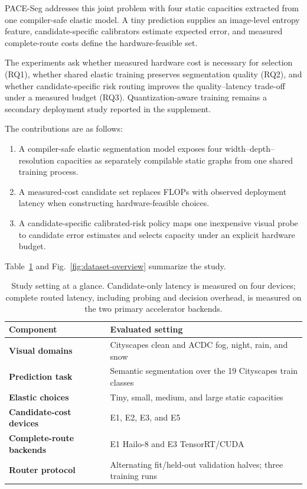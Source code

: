 \documentclass[a4paper,review,12pt]{elsarticle}
\newcommand{\method}{PACE-Seg}
\begin{document}
\method{} addresses this joint problem with four static capacities extracted from one compiler-safe elastic model. A tiny prediction supplies an image-level entropy feature, candidate-specific calibrators estimate expected error, and measured complete-route costs define the hardware-feasible set.

The experiments ask whether measured hardware cost is necessary for selection (RQ1), whether shared elastic training preserves segmentation quality (RQ2), and whether candidate-specific risk routing improves the quality--latency trade-off under a measured budget (RQ3). Quantization-aware training remains a secondary deployment study reported in the supplement.

The contributions are as follows:
\begin{enumerate}
    \item A compiler-safe elastic segmentation model exposes four width--depth--resolution capacities as separately compilable static graphs from one shared training process.
    \item A measured-cost candidate set replaces FLOPs with observed deployment latency when constructing hardware-feasible choices.
    \item A candidate-specific calibrated-risk policy maps one inexpensive visual probe to candidate error estimates and selects capacity under an explicit hardware budget.
\end{enumerate}

Table~\ref{tab:study-setting} and Fig.~\ref{fig:dataset-overview} summarize the study.

\begin{table}[H]
\centering
\caption{Study setting at a glance. Candidate-only latency is measured on four devices; complete routed latency, including probing and decision overhead, is measured on the two primary accelerator backends.}
\label{tab:study-setting}
\small
\begin{tabularx}{\textwidth}{@{}>{\bfseries}lX@{}}
\toprule
Component & Evaluated setting \\
\midrule
Visual domains & Cityscapes clean and ACDC fog, night, rain, and snow \\
Prediction task & Semantic segmentation over the 19 Cityscapes train classes \\
Elastic choices & Tiny, small, medium, and large static capacities \\
Candidate-cost devices & E1, E2, E3, and E5 \\
Complete-route backends & E1 Hailo-8 and E3 TensorRT/CUDA \\
Router protocol & Alternating fit/held-out validation halves; three training runs \\
\bottomrule
\end{tabularx}
\end{table}
\end{document}
